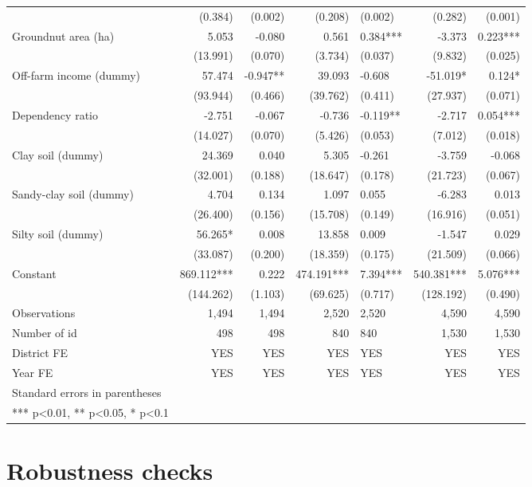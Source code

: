 \documentclass[
]{article}
\begin{document}
\begin{landscape}
\begin{longtable}[t]{lrrrlrr}
 & (0.384) & (0.002) & (0.208) & (0.002) & (0.282) & (0.001)\\
Groundnut area (ha) & 5.053 & -0.080 & 0.561 & 0.384*** & -3.373 & 0.223***\\
\addlinespace
 & (13.991) & (0.070) & (3.734) & (0.037) & (9.832) & (0.025)\\
Off-farm income (dummy) & 57.474 & -0.947** & 39.093 & -0.608 & -51.019* & 0.124*\\
 & (93.944) & (0.466) & (39.762) & (0.411) & (27.937) & (0.071)\\
Dependency ratio & -2.751 & -0.067 & -0.736 & -0.119** & -2.717 & 0.054***\\
 & (14.027) & (0.070) & (5.426) & (0.053) & (7.012) & (0.018)\\
\addlinespace
Clay soil (dummy) & 24.369 & 0.040 & 5.305 & -0.261 & -3.759 & -0.068\\
 & (32.001) & (0.188) & (18.647) & (0.178) & (21.723) & (0.067)\\
Sandy-clay soil (dummy) & 4.704 & 0.134 & 1.097 & 0.055 & -6.283 & 0.013\\
 & (26.400) & (0.156) & (15.708) & (0.149) & (16.916) & (0.051)\\
Silty soil (dummy) & 56.265* & 0.008 & 13.858 & 0.009 & -1.547 & 0.029\\
\addlinespace
 & (33.087) & (0.200) & (18.359) & (0.175) & (21.509) & (0.066)\\
Constant & 869.112*** & 0.222 & 474.191*** & 7.394*** & 540.381*** & 5.076***\\
 & (144.262) & (1.103) & (69.625) & (0.717) & (128.192) & (0.490)\\
Observations & 1,494 & 1,494 & 2,520 & 2,520 & 4,590 & 4,590\\
Number of id & 498 & 498 & 840 & 840 & 1,530 & 1,530\\
\addlinespace
District FE & YES & YES & YES & YES & YES & YES\\
Year FE & YES & YES & YES & YES & YES & YES\\
Standard errors in parentheses &  &  &  &  &  & \\
*** p<0.01, ** p<0.05, * p<0.1 &  &  &  &  &  & \\*
\end{longtable}
\endgroup{}
\end{landscape}

\newpage

\hypertarget{robustness-checks}{%
\section{Robustness checks}\label{robustness-checks}}
\end{document}
